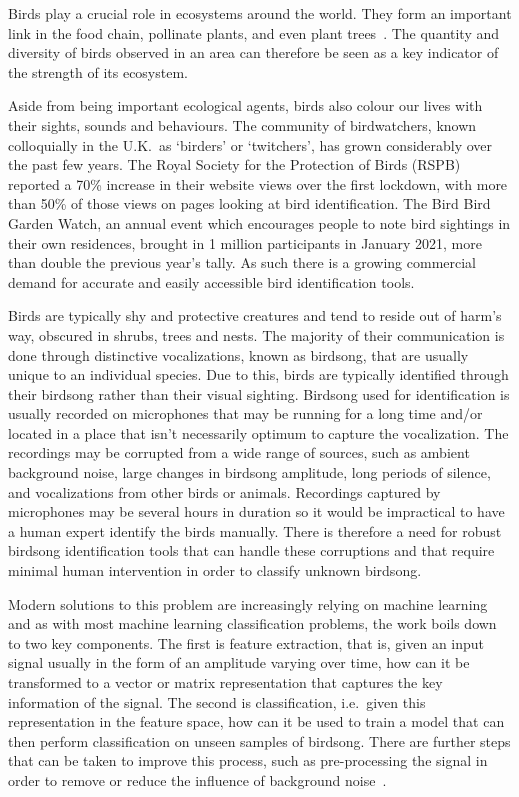 Birds play a crucial role in ecosystems around the world. They form an important
link in the food chain, pollinate plants, and even plant
trees~\cite{broughton2021long}. The quantity and diversity of birds observed in
an area can therefore be seen as a key indicator of the strength of its
ecosystem.

Aside from being important ecological agents, birds also colour our lives with
their sights, sounds and behaviours. The community of birdwatchers, known
colloquially in the U.K.~as `birders' or `twitchers', has grown considerably
over the past few years. The Royal Society for the Protection of Birds (RSPB)
reported a 70\% increase in their website views over the first lockdown, with
more than 50\% of those views on pages looking at bird identification. The Bird
Bird Garden Watch, an annual event which encourages people to note bird
sightings in their own residences, brought in 1 million participants in January
2021, more than double the previous year's tally. As such there is a growing
commercial demand for accurate and easily accessible bird identification tools.

Birds are typically shy and protective creatures and tend to reside out of
harm's way, obscured in shrubs, trees and nests. The majority of their
communication is done through distinctive vocalizations, known as birdsong, that
are usually unique to an individual species. Due to this, birds are typically
identified through their birdsong rather than their visual sighting. Birdsong
used for identification is usually recorded on microphones that may be running
for a long time and/or located in a place that isn't necessarily optimum to
capture the vocalization. The recordings may be corrupted from a wide range of
sources, such as ambient background noise, large changes in birdsong amplitude,
long periods of silence, and vocalizations from other birds or animals.
Recordings captured by microphones may be several hours in duration so it would
be impractical to have a human expert identify the birds manually. There is
therefore a need for robust birdsong identification tools that can handle these
corruptions and that require minimal human intervention in order to classify
unknown birdsong. 

Modern solutions to this problem are increasingly relying on machine learning
and as with most machine learning classification problems, the work boils down
to two key components. The first is feature extraction, that is, given an input
signal usually in the form of an amplitude varying over time, how can it be
transformed to a vector or matrix representation that captures the key
information of the signal. The second is classification, i.e.~given this
representation in the feature space, how can it be used to train a model that
can then perform classification on unseen samples of birdsong. There are further
steps that can be taken to improve this process, such as pre-processing the
signal in order to remove or reduce the influence of background
noise~\cite{potamitis2014automatic}.

